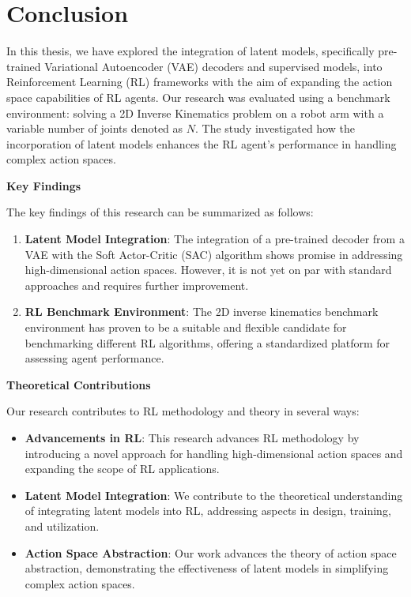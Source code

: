 \chapter{Conclusion}\label{chap:conclusion}

In this thesis, we have explored the integration of latent models, specifically pre-trained Variational Autoencoder (VAE) decoders and supervised models, into Reinforcement Learning (RL) frameworks with the aim of expanding the action space capabilities of RL agents. Our research was evaluated using a benchmark environment: solving a 2D Inverse Kinematics problem on a robot arm with a variable number of joints denoted as $N$. The study investigated how the incorporation of latent models enhances the RL agent's performance in handling complex action spaces.

\textbf{Key Findings}

The key findings of this research can be summarized as follows:

\begin{enumerate}
    \item \textbf{Latent Model Integration}: The integration of a pre-trained decoder from a VAE with the Soft Actor-Critic (SAC) algorithm shows promise in addressing high-dimensional action spaces. However, it is not yet on par with standard approaches and requires further improvement.
    \item \textbf{RL Benchmark Environment}: The 2D inverse kinematics benchmark environment has proven to be a suitable and flexible candidate for benchmarking different RL algorithms, offering a standardized platform for assessing agent performance.
\end{enumerate}

\textbf{Theoretical Contributions}

Our research contributes to RL methodology and theory in several ways:

\begin{itemize}
    \item \textbf{Advancements in RL}: This research advances RL methodology by introducing a novel approach for handling high-dimensional action spaces and expanding the scope of RL applications.
    \item \textbf{Latent Model Integration}: We contribute to the theoretical understanding of integrating latent models into RL, addressing aspects in design, training, and utilization.
    \item \textbf{Action Space Abstraction}: Our work advances the theory of action space abstraction, demonstrating the effectiveness of latent models in simplifying complex action spaces.
\end{itemize}

